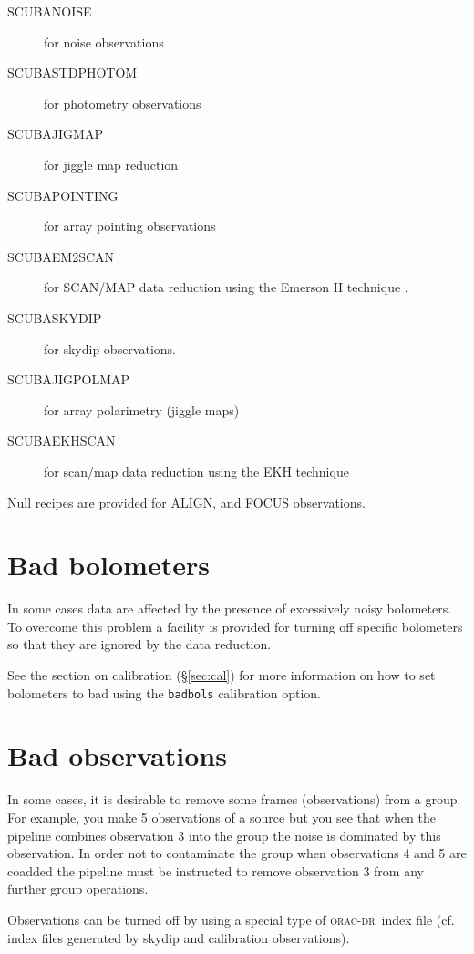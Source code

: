 \documentclass[twoside,11pt]{article}
\newcommand{\xref}[3]{#1}
\newcommand{\xlabel}[1]{}
\renewcommand{\_}{\texttt{\symbol{95}}}
\newcommand{\oracdr}{\xref{\textsc{orac-dr}}{sun230}{}}
\newcommand{\recipe}[1]{{\small\textsf{#1}}}
\begin{document}
\begin{description}
\item[\recipe{SCUBA\_NOISE}] for noise observations
\item[\recipe{SCUBA\_STD\_PHOTOM}] for photometry observations
\item[\recipe{SCUBA\_JIGMAP}] for jiggle map reduction
\item[\recipe{SCUBA\_POINTING}] for array pointing observations
\item[\recipe{SCUBA\_EM2SCAN}] for SCAN/MAP data reduction using the Emerson II
technique \cite{EII}. 
\item[\recipe{SCUBA\_SKYDIP}] for skydip observations.
\item[\recipe{SCUBA\_JIGPOLMAP}] for array polarimetry (jiggle maps)
\item[\recipe{SCUBA\_EKHSCAN}] for scan/map data reduction using the EKH \cite{ekh} technique
\end{description}

Null recipes are provided for ALIGN, and FOCUS observations.


\section{Bad bolometers\xlabel{bad_bolometers}}

In some cases data are affected by the presence of excessively noisy
bolometers. To overcome this problem a facility is provided for turning
off specific bolometers so that they are ignored by the data reduction.

See the section on calibration (\S\ref{sec:cal}) for more information on how
to set bolometers to bad using the \texttt{badbols} calibration option.


\section{Bad observations\xlabel{bad_observations}}

In some cases, it is desirable to remove some frames (observations)
from a group. For example, you make 5 observations of a source
but you see that when the pipeline combines observation 3 into the
group the noise is dominated by this observation. In order
not to contaminate the group when observations 4 and 5 are coadded
the pipeline must be instructed to remove observation 3 from any further
group operations.

Observations can be turned off by using a special type of
\oracdr\ index file (cf. index files generated by skydip and
calibration observations).
\end{document}
